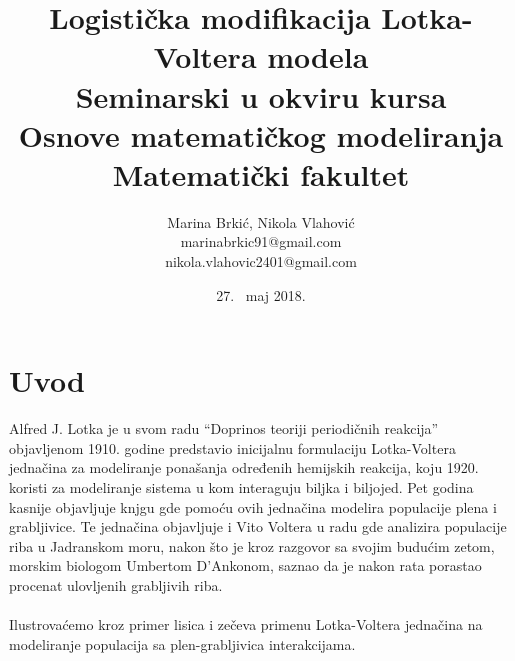 \documentclass[a4paper]{article}
\begin{document}
\title{Logistička modifikacija Lotka-Voltera modela\\
	\small{Seminarski u okviru kursa\\Osnove matematičkog modeliranja\\Matematički fakultet}
}
\author{Marina Brkić, Nikola Vlahović\\marinabrkic91@gmail.com\\nikola.vlahovic2401@gmail.com}
\date{27. ~maj 2018.}
\maketitle
{}
\tableofcontents

\newpage

\section{Uvod}
\label{sec:uvod}

Alfred J. Lotka je u svom radu ``Doprinos teoriji periodičnih reakcija'' objavljenom 1910. godine predstavio
inicijalnu formulaciju Lotka-Voltera jednačina za modeliranje ponašanja određenih hemijskih reakcija, koju
1920. koristi za modeliranje sistema u kom interaguju biljka i biljojed. Pet godina kasnije objavljuje knjgu
gde pomoću ovih jednačina modelira populacije plena i grabljivice. Te jednačina objavljuje i Vito Voltera
u radu gde analizira populacije riba u Jadranskom moru, nakon što je kroz razgovor sa svojim budućim zetom,
morskim biologom Umbertom D'Ankonom, saznao da je nakon rata porastao procenat ulovljenih grabljivih riba.
\\\\

Ilustrovaćemo kroz primer lisica i zečeva primenu Lotka-Voltera jednačina na modeliranje
populacija sa plen-grabljivica interakcijama.
\end{document}
